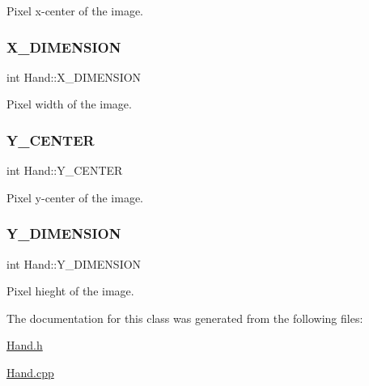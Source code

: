 Pixel x-\/center of the image. 

\hypertarget{class_hand_a406c0335ce812fd226df4678e3322558}{}\label{class_hand_a406c0335ce812fd226df4678e3322558} 
\subsubsection{\texorpdfstring{X\+\_\+\+D\+I\+M\+E\+N\+S\+I\+ON}{X\_DIMENSION}}
{\footnotesize\ttfamily int Hand\+::\+X\+\_\+\+D\+I\+M\+E\+N\+S\+I\+ON\hspace{0.3cm}{\ttfamily [protected]}}



Pixel width of the image. 

\hypertarget{class_hand_ab213d81fcf0ed7086ba82540824c3fd9}{}\label{class_hand_ab213d81fcf0ed7086ba82540824c3fd9} 
\subsubsection{\texorpdfstring{Y\+\_\+\+C\+E\+N\+T\+ER}{Y\_CENTER}}
{\footnotesize\ttfamily int Hand\+::\+Y\+\_\+\+C\+E\+N\+T\+ER\hspace{0.3cm}{\ttfamily [protected]}}



Pixel y-\/center of the image. 

\hypertarget{class_hand_a7d6177d54f9bf9b7e6c0e0d8aff5f935}{}\label{class_hand_a7d6177d54f9bf9b7e6c0e0d8aff5f935} 
\subsubsection{\texorpdfstring{Y\+\_\+\+D\+I\+M\+E\+N\+S\+I\+ON}{Y\_DIMENSION}}
{\footnotesize\ttfamily int Hand\+::\+Y\+\_\+\+D\+I\+M\+E\+N\+S\+I\+ON\hspace{0.3cm}{\ttfamily [protected]}}



Pixel hieght of the image. 



The documentation for this class was generated from the following files\+:\begin{DoxyCompactItemize}
\item 
\hyperlink{_hand_8h}{Hand.\+h}\item 
\hyperlink{_hand_8cpp}{Hand.\+cpp}\end{DoxyCompactItemize}
